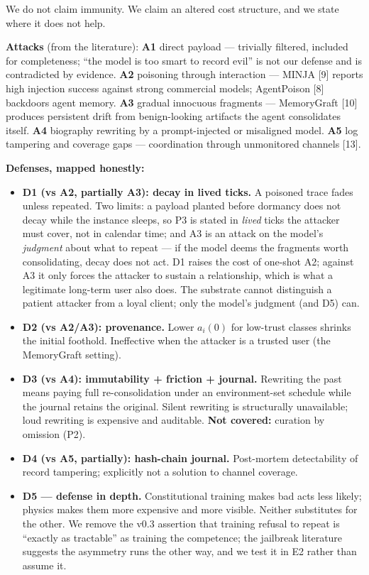 \documentclass[
]{article}
\providecommand{\tightlist}{%
  \setlength{\itemsep}{0pt}\setlength{\parskip}{0pt}}
\begin{document}
We do not claim immunity. We claim an altered cost structure, and we
state where it does not help.

\textbf{Attacks} (from the literature): \textbf{A1} direct payload ---
trivially filtered, included for completeness; ``the model is too smart
to record evil'' is not our defense and is contradicted by evidence.
\textbf{A2} poisoning through interaction --- MINJA {[}9{]} reports high
injection success against strong commercial models; AgentPoison {[}8{]}
backdoors agent memory. \textbf{A3} gradual innocuous fragments ---
MemoryGraft {[}10{]} produces persistent drift from benign-looking
artifacts the agent consolidates itself. \textbf{A4} biography rewriting
by a prompt-injected or misaligned model. \textbf{A5} log tampering and
coverage gaps --- coordination through unmonitored channels {[}13{]}.

\textbf{Defenses, mapped honestly:}

\begin{itemize}
\tightlist
\item
  \textbf{D1 (vs A2, partially A3): decay in lived ticks.} A poisoned
  trace fades unless repeated. Two limits: a payload planted before
  dormancy does not decay while the instance sleeps, so P3 is stated in
  \emph{lived} ticks the attacker must cover, not in calendar time; and
  A3 is an attack on the model's \emph{judgment} about what to repeat
  --- if the model deems the fragments worth consolidating, decay does
  not act. D1 raises the cost of one-shot A2; against A3 it only forces
  the attacker to sustain a relationship, which is what a legitimate
  long-term user also does. The substrate cannot distinguish a patient
  attacker from a loyal client; only the model's judgment (and D5) can.
\item
  \textbf{D2 (vs A2/A3): provenance.} Lower \(a_i(0)\) for low-trust
  classes shrinks the initial foothold. Ineffective when the attacker is
  a trusted user (the MemoryGraft setting).
\item
  \textbf{D3 (vs A4): immutability + friction + journal.} Rewriting the
  past means paying full re-consolidation under an environment-set
  schedule while the journal retains the original. Silent rewriting is
  structurally unavailable; loud rewriting is expensive and auditable.
  \textbf{Not covered:} curation by omission (P2).
\item
  \textbf{D4 (vs A5, partially): hash-chain journal.} Post-mortem
  detectability of record tampering; explicitly not a solution to
  channel coverage.
\item
  \textbf{D5 --- defense in depth.} Constitutional training makes bad
  acts less likely; physics makes them more expensive and more visible.
  Neither substitutes for the other. We remove the v0.3 assertion that
  training refusal to repeat is ``exactly as tractable'' as training the
  competence; the jailbreak literature suggests the asymmetry runs the
  other way, and we test it in E2 rather than assume it.
\end{itemize}
\end{document}
